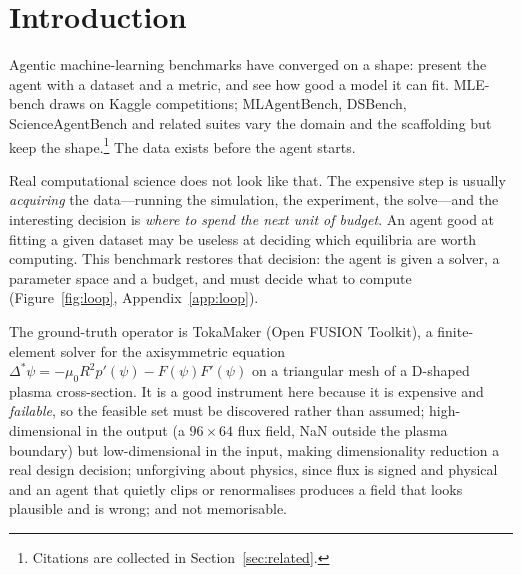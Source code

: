 \section{Introduction}
\label{sec:intro}

Agentic machine-learning benchmarks have converged on a shape: present the agent
with a dataset and a metric, and see how good a model it can fit. MLE-bench
draws on Kaggle competitions; MLAgentBench, DSBench, ScienceAgentBench and
related suites vary the domain and the scaffolding but keep the
shape.\footnote{Citations are collected in Section~\ref{sec:related}.} The data
exists before the agent starts.

Real computational science does not look like that. The expensive step is
usually \emph{acquiring} the data---running the simulation, the experiment, the
solve---and the interesting decision is \emph{where to spend the next unit of
budget}. An agent good at fitting a given dataset may be useless at deciding
which equilibria are worth computing. This benchmark restores that decision: the
agent is given a solver, a parameter space and a budget, and must decide what to
compute (Figure~\ref{fig:loop}, Appendix~\ref{app:loop}).

The ground-truth operator is TokaMaker (Open FUSION Toolkit), a finite-element
solver for the axisymmetric \GS{} equation
$\Delta^{*}\psi = -\mu_{0}R^{2}p'(\psi) - F(\psi)F'(\psi)$ on a triangular mesh
of a D-shaped plasma cross-section. It is a good instrument here because it is
expensive and \emph{failable}, so the feasible set must be discovered rather
than assumed; high-dimensional in the output (a $96\times64$ flux field, NaN
outside the plasma boundary) but low-dimensional in the input, making
dimensionality reduction a real design decision; unforgiving about physics,
since flux is signed and physical and an agent that quietly clips or
renormalises produces a field that looks plausible and is wrong; and not
memorisable.

